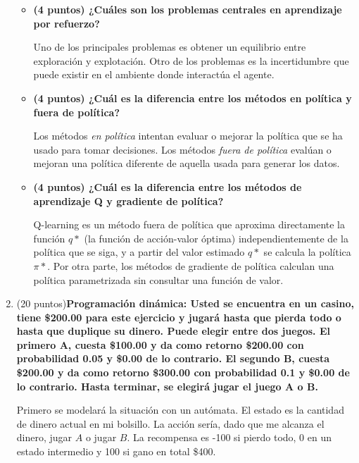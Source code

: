\documentclass[a4paper,10pt]{article}
\begin{document}
\begin{enumerate}
\begin{itemize}
        \item \textbf{(4 puntos) ¿Cuáles son los problemas centrales en aprendizaje por refuerzo?}
        
        Uno de los principales problemas es obtener un equilibrio entre exploración y explotación. Otro de los problemas es la incertidumbre que puede existir en el ambiente donde interactúa el agente.
        
        \item \textbf{(4 puntos) ¿Cuál es la diferencia entre los métodos en política y fuera de política?}
        
        Los métodos \textit{en política} intentan evaluar o mejorar la política que se ha usado para tomar decisiones. Los métodos \textit{fuera de política} evalúan o mejoran una política diferente de aquella usada para generar los datos.
        
        \item \textbf{(4 puntos) ¿Cuál es la diferencia entre los métodos de aprendizaje Q y gradiente de política?}
        
        Q-learning es un método fuera de política que aproxima directamente la función $q*$ (la función de acción-valor óptima) independientemente de la política que se siga, y a partir del valor estimado $q*$ se calcula la política $\pi *$. Por otra parte, los métodos de gradiente de política calculan una política parametrizada sin consultar una función de valor.
        
    \end{itemize}
    
    \item (20 puntos)\textbf{Programación dinámica: Usted se encuentra en un casino, tiene \$200.00 para este ejercicio y jugará hasta que pierda todo o hasta que duplique su dinero. Puede elegir entre dos juegos. El primero A, cuesta \$100.00 y da como retorno \$200.00 con probabilidad 0.05 y \$0.00 de lo contrario. El segundo B, cuesta \$200.00 y da como retorno \$300.00 con probabilidad 0.1 y \$0.00 de lo contrario. Hasta terminar, se elegirá jugar el juego A o B.}
   
Primero se modelará la situación con un autómata. El estado es la cantidad de dinero actual en mi bolsillo. La acción sería, dado que me alcanza el dinero, jugar $A$ o jugar $B$. La recompensa es -100 si pierdo todo, 0 en un estado intermedio y 100 si gano en total \$400.


\end{enumerate}
\end{document}
